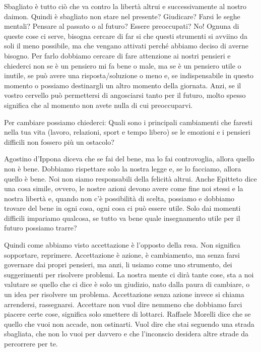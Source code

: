 \documentclass[12pt]{book} %
\begin{document}
Sbagliato è tutto ciò che va contro la libertà altrui e successivamente al nostro daimon. Quindi è sbagliato non stare
nel presente? Giudicare? Farsi le seghe mentali? Pensare al passato o al futuro? Essere preoccupati? No! Ognuna di
queste cose ci serve, bisogna cercare di far si che questi strumenti si avviino da soli il meno possibile, ma che
vengano attivati perché abbiamo deciso di averne bisogno. Per farlo dobbiamo cercare di fare attenzione ai nostri
pensieri e chiederci non se è un pensiero mi fa bene o male, ma se è un pensiero utile o inutile, se può avere una
risposta/soluzione o meno e, se indispensabile in questo momento o possiamo destinargli un altro momento della
giornata. Anzi, se il vostro cervello può permettersi di angosciarsi tanto per il futuro, molto spesso significa che al
momento non avete nulla di cui preoccuparvi.

Per cambiare possiamo chiederci: Quali sono i principali cambiamenti che faresti nella tua vita (lavoro, relazioni,
sport e tempo libero) se le emozioni e i pensieri difficili non fossero più un ostacolo?

Agostino d'Ippona diceva che se fai del bene, ma lo fai controvoglia, allora quello non è bene. Dobbiamo rispettare solo
la nostra legge e, se lo facciamo, allora quello è bene. Noi non siamo responsabili della felicità altrui. Anche
Epitteto dice una cosa simile, ovvero, le nostre azioni devono avere come fine noi stessi e la nostra libertà e, quando
non c'è possibilità di scelta, possiamo e dobbiamo trovare del bene in ogni cosa, ogni cosa ci può
essere utile. Solo dai momenti difficili impariamo qualcosa, se tutto va bene quale insegnamento utile per il futuro
possiamo trarre?

Quindi come abbiamo visto accettazione è l'opposto della resa. Non significa sopportare, reprimere.
Accettazione è azione, è cambiamento, ma senza farsi governare dai propri pensieri, ma anzi, li usiamo come uno
strumento, dei suggerimenti per risolvere problemi. La nostra mente ci dirà tante cose, sta a noi valutare se quello
che ci dice è solo un giudizio, nato dalla paura di cambiare, o un idea per risolvere un problema. Accettazione senza
azione invece si chiama arrendersi, rassegnarsi. Accettare non vuol dire nemmeno che dobbiamo farci piacere certe cose,
significa solo smettere di lottarci.
Raffaele Morelli dice che se quello che vuoi non accade, non ostinarti. Vuol dire che stai seguendo una strada sbagliata, che non lo vuoi per davvero e che l'inconscio desidera altre strade da percorrere per te. 
\end{document}
